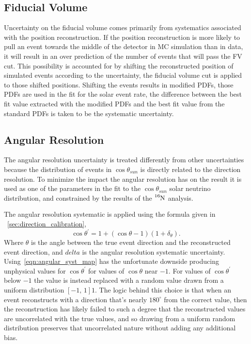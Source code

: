 \subsection{Fiducial Volume}
Uncertainty on the fiducial volume comes primarily from systematics associated
with the position reconstruction.
If the position reconstruction is more likely to pull an event towards the
middle of the detector
in MC simulation than in data, it will result in an over prediction of the
number of events that will pass the FV cut.
This possibility is accounted for by shifting the reconstructed position of
simulated events according to the uncertainty, the fiducial volume cut is
applied to those shifted positions.  Shifting the events results in modified
PDFs, those PDFs are used in the fit for the solar event rate, the difference
between the best fit value extracted with the modified PDFs and the best fit
value from the standard PDFs is taken to be the systematic uncertainty.
\subsection{Angular Resolution}
\label{sec:angular_systematics}
The angular resolution uncertainty is treated differently from other
uncertainties because the distribution of events in $\cos\theta_{sun}$ is
directly related to the direction resolution.  To minimize the impact the
angular resolution has on the result it is used as one of the parameters in the
fit to the $\cos\theta_{sun}$ solar neutrino distribution, and constrained by
the results of the $\ce{^{16}N}$ analysis.

The angular resolution systematic is applied using the formula given in
~\ref{sec:direction_calibration},
\begin{equation}
    \cos\theta^{\prime} = 1 + (\cos\theta - 1)(1+\delta_{\theta})\text{.}
    \label{eqn:angular_syst_map}
\end{equation}
Where $\theta$ is the angle between the true event direction and the reconstructed
event direction, and $delta$ is the angular resolution systematic uncertainty.
Using~\eqref{eqn:angular_syst_map} has the unfortunate downside producing
unphysical values for $\cos\theta^{\prime}$ for values of $\cos\theta$ near
$-1$. For values of $\cos\theta^{\prime}$ below $-1$ the value is instead replaced
with a random value drawn from a uniform distribution $\left[-1\text{, }1\right]1$.
The logic behind this choice is that when an event reconstructs with a direction
that's nearly $180^{\circ}$ from the correct value, then the reconstruction
has likely failed to such a degree that the reconstructed values are uncorrelated
with the true values, and so drawing from a uniform random distribution preserves
that uncorrelated nature without adding any additional bias.

